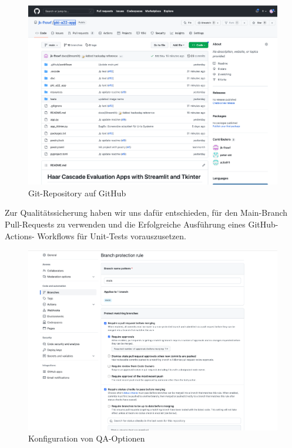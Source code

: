 \documentclass{article}
\begin{document}
\begin{figure}[h]
	\begin{center}
 	\includegraphics[scale=0.40]{../images/ci_git.png}
 	\caption{Git-Repository auf GitHub}
	\end{center}
\end{figure}

Zur Qualitätssicherung haben wir uns dafür entschieden, für den Main-Branch
Pull-Requests zu verwenden und die Erfolgreiche Ausführung eines GitHub-Actions-
Workflows für Unit-Tests vorauszusetzen.

\begin{figure}[h]
	\begin{center}
 	\includegraphics[scale=0.40]{../images/ci_protection.png}
 	\caption{Konfiguration von QA-Optionen}
	\end{center}
\end{figure}
\end{document}
